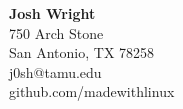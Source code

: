 \documentclass[12pt]{article}
\begin{document}
\noindent
{}
\sffamily

\begin{center}
{\Large \textbf{Josh Wright}\\}
750 Arch Stone\\
San Antonio, TX 78258\\
j0sh@tamu.edu\\
github.com/madewithlinux\\
\end{center}

\end{document}
